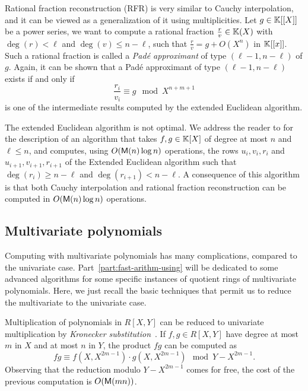 Rational fraction
reconstruction (RFR) is very similar to Cauchy
interpolation, and it can be viewed as a generalization of it using
multiplicities. Let $g\in\mathbb{K}[[X]]$ be a power series, we want to
compute a rational fraction $\frac{r}{v}\in\mathbb{K}(X)$ with $\deg(r)<\ell$
and $\deg(v)\le n-\ell$, such that $\frac{r}{v}=g+O(X^n)$ in
$\mathbb{K}[[x]]$. Such a rational fraction is called a
\emph{Padé approximant} of type
$(\ell-1,n-\ell)$ of $g$. Again, it can be shown that a Padé
approximant of type $(\ell-1,n-\ell)$ exists if and only if
\begin{equation}
  \label{eq:210}
  \frac{r_i}{v_i}\equiv g \mod X^{n+m+1}
\end{equation}
is one of the intermediate results computed by the extended Euclidean
algorithm.

The extended Euclidean algorithm is not optimal. We address the reader
to \cite[$\S$11.1]{vzGG} for the description of an algorithm that
takes $f,g\in\mathbb{K}[X]$ of degree at most $n$ and $\ell\le n$, and
computes, using $O(\mathsf{M}(n)\allowbreak\log n)$ operations, the rows $u_i,v_i,r_i$
and $u_{i+1},v_{i+1},r_{i+1}$ of the Extended Euclidean algorithm such
that $\deg(r_i)\ge n-\ell$ and $\deg(r_{i+1})<n-\ell$. A consequence
of this algorithm is that both Cauchy interpolation and rational
fraction reconstruction can be computed in $O(\mathsf{M}(n)\log n)$
operations.



\subsection{Multivariate polynomials}
\label{sec:mult-polyn}
Computing with multivariate polynomials has many complications,
compared to the univariate case. Part~\ref{part:fast-arithm-using}
will be dedicated to some advanced algorithms for some specific
instances of quotient rings of multivariate polynomials. Here, we just
recall the basic techniques that permit us to reduce the multivariate
to the univariate case.

  Multiplication of polynomials in
$R[X,Y]$ can be reduced to univariate multiplication by
\emph{Kronecker
  substitution}~\cite{moenck76,kaltofen87,vzGG,vzgathen+shoup92,harvey09}. If
$f,g\in R[X,Y]$ have degree at most $m$ in $X$ and at most $n$ in $Y$,
the product $fg$ can be computed as
\begin{equation}
  \label{eq:222}
  fg \equiv f(X,X^{2m-1})\cdot g(X,X^{2m-1}) \mod Y-X^{2m-1}
  \text{.}
\end{equation}
Observing that the reduction modulo $Y-X^{2m-1}$ comes for free, the
cost of the previous computation is $O(\mathsf{M}(mn))$.

